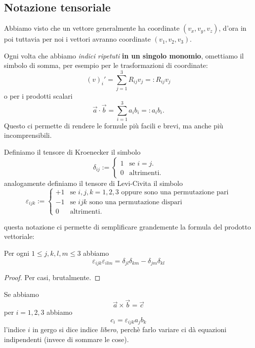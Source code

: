 \documentclass[11pt]{scrartcl}
\begin{document}
	\subsection{Notazione tensoriale}
	
	Abbiamo visto che un vettore generalmente ha coordinate $(v_x,v_y,v_z)$, d'ora in poi tuttavia per noi i vettori avranno coordinate $(v_1,v_2,v_3)$.
	\begin{definition}
		Ogni volta che abbiamo \textit{indici ripetuti} \textbf{in un singolo monomio}, omettiamo il simbolo di somma, per esempio per le trasformazioni di coordinate:
		$$(v)_i'=\sum_{j=1}^{3}R_{ij}v_j=:R_{ij}v_j$$
		o per i prodotti scalari
		$$\vec{a}\cdot \vec{b}=\sum_{i=1}^{3}a_ib_i=:a_ib_i.$$
		Questo ci permette di rendere le formule più facili e brevi, ma anche più incomprensibili.
	\end{definition}
	\begin{definition}
		Definiamo il tensore di Kroenecker il simbolo
		$$
		\delta_{ij}:=
		\begin{cases}
			1 & \text{se $i=j$.}\\
			0 & \text{altrimenti.}
		\end{cases}
		$$
		analogamente definiamo il tensore di Levi-Civita il simbolo
		$$
		\varepsilon_{ijk}:=
		\begin{cases}
			+1 & \text{se $i,j,k=1,2,3$ oppure sono una permutazione pari} \\
			-1 & \text{se $ijk$ sono una permutazione dispari} \\
			0 & \text{altrimenti}.
		\end{cases}
		$$
	\end{definition}
	questa notazione ci permette di semplificare grandemente la formula del prodotto vettoriale: 
	\begin{proposition}
		Per ogni $1\le j,k,l,m\le 3$ abbiamo 
		$$\varepsilon_{ijk}\varepsilon_{ilm}=\delta_{jl}\delta_{km}-\delta_{jm}\delta_{kl}$$
	\end{proposition}
	\begin{proof}
		Per casi, brutalmente.
	\end{proof}
	\begin{proposition}
		Se abbiamo
		$$\vec{a}\times \vec{b}=\vec{c}$$
		per $i=1,2,3$ abbiamo
		$$c_i=\varepsilon_{ijk}a_jb_k$$
		l'indice $i$ in gergo si dice indice \textit{libero}, perchè farlo variare ci dà equazioni indipendenti (invece di sommare le cose).
	\end{proposition}
\end{document}
